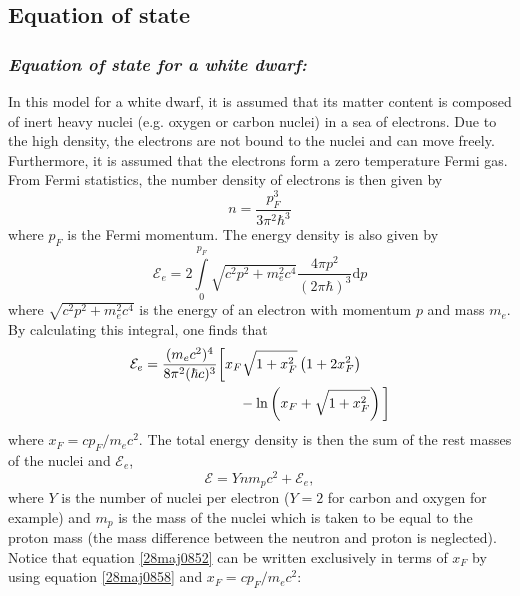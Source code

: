\documentclass[twocolumn]{article}
\begin{document}
\begin{large}
\subsection*{Equation of state}
\subsubsection*{\textit{Equation of state for a white dwarf:}}
In this model for a white dwarf, it is assumed that its matter content is composed of inert heavy nuclei (e.g. oxygen or carbon nuclei) in a sea of electrons. Due to the high density, the electrons are not bound to the nuclei and can move freely. Furthermore, it is assumed that the electrons form a zero temperature Fermi gas. From Fermi statistics, the number density of electrons is then given by
\begin{equation}
    \label{28maj0858}
    n = \frac{p_F^3}{3\pi^2\hbar^3}
\end{equation}
where $p_F$ is the Fermi momentum. The energy density is also given by 
\begin{equation}
    \mathcal{E}_e = 2\int\limits_0^{p_F}\sqrt{c^2p^2+m_e^2c^4}\frac{4\pi p^2}{(2\pi\hbar)^3}\text{d}p
\end{equation}
where $\sqrt{c^2p^2+m_e^2c^4}$ is the energy of an electron with momentum $p$ and mass $m_e$. By calculating this integral, one finds that 
\begin{equation}
    \label{28maj0910}
    \begin{split}
        &\mathcal{E}_e = \frac{(m_ec^2)^4}{8\pi^2(\hbar c)^3}\bigg[x_F\sqrt{1+x_F^2}\left(1+2x_F^2\right) \\ 
        &\hspace{2.75cm}-\ln\left(x_F+\sqrt{1+x_F^2}\right)\bigg] \\ 
    \end{split}
\end{equation}
where $x_F = cp_F/m_ec^2$. The total energy density is then the sum of the rest masses of the nuclei and $\mathcal{E}_e$,
\begin{equation}
    \label{28maj0852}
    \mathcal{E} = Ynm_pc^2 + \mathcal{E}_e,
\end{equation}
where $Y$ is the number of nuclei per electron ($Y=2$ for carbon and oxygen for example) and $m_p$ is the mass of the nuclei which is taken to be equal to the proton mass (the mass difference between the neutron and proton is neglected). Notice that equation \eqref{28maj0852} can be written exclusively in terms of $x_F$ by using equation \eqref{28maj0858} and $x_F=cp_F/m_ec^2$:

\end{large}
\end{document}
